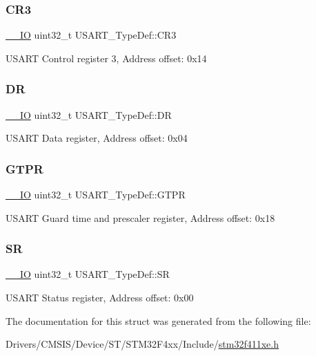 \subsubsection{\texorpdfstring{C\+R3}{CR3}}
{\footnotesize\ttfamily \hyperlink{core__sc300_8h_aec43007d9998a0a0e01faede4133d6be}{\+\_\+\+\_\+\+IO} uint32\+\_\+t U\+S\+A\+R\+T\+\_\+\+Type\+Def\+::\+C\+R3}

U\+S\+A\+RT Control register 3, Address offset\+: 0x14 \mbox{\label{struct_u_s_a_r_t___type_def_a1db25b74d47af33dc4f4fe2177fc5da0}} 
\subsubsection{\texorpdfstring{DR}{DR}}
{\footnotesize\ttfamily \hyperlink{core__sc300_8h_aec43007d9998a0a0e01faede4133d6be}{\+\_\+\+\_\+\+IO} uint32\+\_\+t U\+S\+A\+R\+T\+\_\+\+Type\+Def\+::\+DR}

U\+S\+A\+RT Data register, Address offset\+: 0x04 \mbox{\label{struct_u_s_a_r_t___type_def_ae23acff49b4ff96fd29093e80fc7d72e}} 
\subsubsection{\texorpdfstring{G\+T\+PR}{GTPR}}
{\footnotesize\ttfamily \hyperlink{core__sc300_8h_aec43007d9998a0a0e01faede4133d6be}{\+\_\+\+\_\+\+IO} uint32\+\_\+t U\+S\+A\+R\+T\+\_\+\+Type\+Def\+::\+G\+T\+PR}

U\+S\+A\+RT Guard time and prescaler register, Address offset\+: 0x18 \mbox{\label{struct_u_s_a_r_t___type_def_a706005f59139b9ff8ee5755677e12bc7}} 
\subsubsection{\texorpdfstring{SR}{SR}}
{\footnotesize\ttfamily \hyperlink{core__sc300_8h_aec43007d9998a0a0e01faede4133d6be}{\+\_\+\+\_\+\+IO} uint32\+\_\+t U\+S\+A\+R\+T\+\_\+\+Type\+Def\+::\+SR}

U\+S\+A\+RT Status register, Address offset\+: 0x00 

The documentation for this struct was generated from the following file\+:\begin{DoxyCompactItemize}
\item 
Drivers/\+C\+M\+S\+I\+S/\+Device/\+S\+T/\+S\+T\+M32\+F4xx/\+Include/\hyperlink{stm32f411xe_8h}{stm32f411xe.\+h}\end{DoxyCompactItemize}
